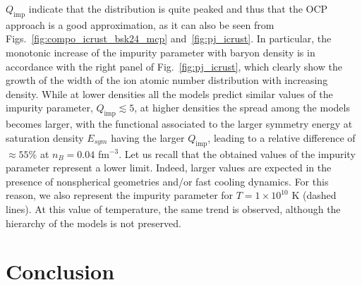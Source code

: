 $Q_{\text{imp}}$ indicate that the distribution is quite peaked and thus that 
the OCP approach is a good approximation, as it can also be seen from
Figs.~\ref{fig:compo_icrust_bsk24_mcp} and~\ref{fig:pj_icrust}. In particular, 
the monotonic increase of the impurity parameter with baryon density is in 
accordance with the right panel of Fig.~\ref{fig:pj_icrust}, which clearly show 
the growth of the width of the ion atomic number distribution with increasing 
density. 
%
While at lower densities all the models predict similar values of the impurity 
parameter, $Q_{\text{imp}} \lesssim 5$, at higher densities the spread among 
the models becomes larger, with the functional associated to the larger 
symmetry energy at saturation density $E_{sym}$ having the larger 
$Q_{\text{imp}}$, leading to a relative difference of $\approx 55\%$ at $n_B
= 0.04$ fm$^{-3}$. 
Let us recall that the obtained values of the impurity parameter represent a
lower limit. Indeed, larger values are expected in the presence of nonspherical
geometries and/or fast cooling dynamics. For this reason, we also represent the
impurity parameter for $T= 1\times 10^{10}$ K (dashed 
lines). At this value of temperature, the same trend is observed, although the 
hierarchy of the models is not preserved.

\section{Conclusion}

